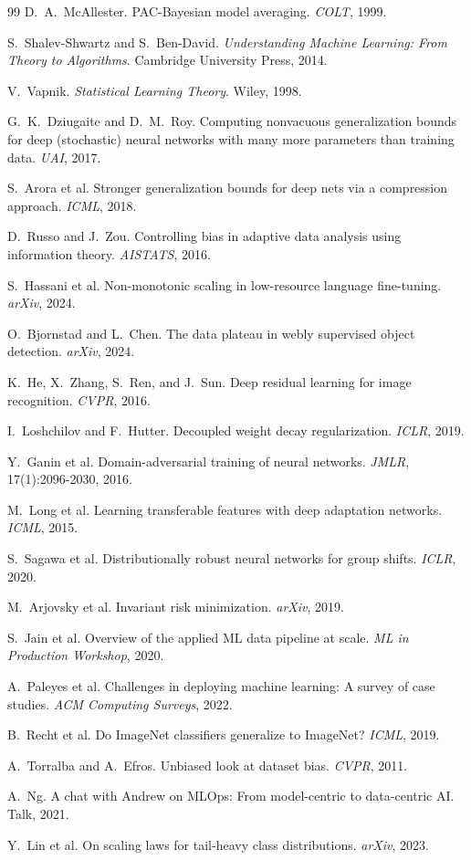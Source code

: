 \documentclass[11pt]{article}
\begin{document}
\begin{thebibliography}{99}
 D.\ A.\ McAllester. PAC-Bayesian model averaging. \emph{COLT}, 1999.

 S.\ Shalev-Shwartz and S.\ Ben-David. \emph{Understanding Machine Learning: From Theory to Algorithms}. Cambridge University Press, 2014.

 V.\ Vapnik. \emph{Statistical Learning Theory}. Wiley, 1998.

 G.\ K.\ Dziugaite and D.\ M.\ Roy. Computing nonvacuous generalization bounds for deep (stochastic) neural networks with many more parameters than training data. \emph{UAI}, 2017.

 S.\ Arora et al. Stronger generalization bounds for deep nets via a compression approach. \emph{ICML}, 2018.

 D.\ Russo and J.\ Zou. Controlling bias in adaptive data analysis using information theory. \emph{AISTATS}, 2016.

 S.\ Hassani et al. Non-monotonic scaling in low-resource language fine-tuning. \emph{arXiv}, 2024.

 O.\ Bjornstad and L.\ Chen. The data plateau in webly supervised object detection. \emph{arXiv}, 2024.

 K.\ He, X.\ Zhang, S.\ Ren, and J.\ Sun. Deep residual learning for image recognition. \emph{CVPR}, 2016.

 I.\ Loshchilov and F.\ Hutter. Decoupled weight decay regularization. \emph{ICLR}, 2019.

 Y.\ Ganin et al. Domain-adversarial training of neural networks. \emph{JMLR}, 17(1):2096-2030, 2016.

 M.\ Long et al. Learning transferable features with deep adaptation networks. \emph{ICML}, 2015.

 S.\ Sagawa et al. Distributionally robust neural networks for group shifts. \emph{ICLR}, 2020.

 M.\ Arjovsky et al. Invariant risk minimization. \emph{arXiv}, 2019.

 S.\ Jain et al. Overview of the applied ML data pipeline at scale. \emph{ML in Production Workshop}, 2020.

 A.\ Paleyes et al. Challenges in deploying machine learning: A survey of case studies. \emph{ACM Computing Surveys}, 2022.

 B.\ Recht et al. Do ImageNet classifiers generalize to ImageNet? \emph{ICML}, 2019.

 A.\ Torralba and A.\ Efros. Unbiased look at dataset bias. \emph{CVPR}, 2011.

 A.\ Ng. A chat with Andrew on MLOps: From model-centric to data-centric AI. Talk, 2021.

 Y.\ Lin et al. On scaling laws for tail-heavy class distributions. \emph{arXiv}, 2023.

\end{thebibliography}
\end{document}
